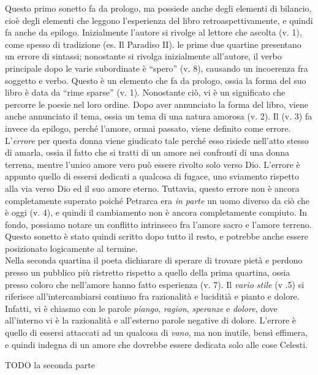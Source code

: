 \documentclass[a4paper]{article}
\newcommand{\quotes}[1]{``#1''}
\begin{document}
Questo primo sonetto fa da prologo, ma possiede anche degli elementi di bilancio,
cioè degli elementi che leggono l'esperienza del libro retroaspettivamente,
e quindi fa anche da epilogo.
Inizialmente l'autore si rivolge al lettore che ascolta (v. 1), come spesso di tradizione (es. Il Paradiso II).
le prime due quartine presentano un errore di sintassi; nonostante si rivolga inizialmente all'autore,
il verbo principale dopo le varie subordinate è \quotes{spero} (v. 8), causando un incoerenza fra soggetto e verbo.
Questo è un elemento che fa da prologo, ossia la forma del suo libro è data da \quotes{rime sparse} (v. 1).
Nonostante ciò, vi è un significato che percorre le poesie nel loro ordine.
Dopo aver annunciato la forma del libro, viene anche annunciato il tema, ossia
un tema di una natura amorosa (v. 2).
Il (v. 3) fa invece da epilogo, perché l'amore, ormai passato, viene definito come errore.
L'\textit{errore} per questa donna viene giudicato tale perché esso risiede nell'atto stesso di amarla,
ossia il fatto che si tratti di un amore nei confronti di una donna terrena, mentre l'unico amore
vero può essere rivolto solo verso Dio. L'errore è appunto quello di essersi dedicati a qualcosa di fugace,
uno sviamento rispetto alla via verso Dio ed il suo amore eterno.
Tuttavia, questo errore non è ancora completamente superato poiché Petrarca
era \textit{in parte} un uomo diverso da ciò che è oggi (v. 4), e quindi il cambiamento non è ancora
completamente compiuto.
In fondo, possiamo notare un conflitto intrinseco fra l'amore sacro e l'amore terreno.
Questo sonetto è stato quindi scritto dopo tutto il resto, e potrebbe anche essere posizionato
logicamente al termine.
\\
Nella seconda quartina il poeta dichiarare di sperare di trovare pietà e perdono
presso un pubblico più ristretto rispetto a quello della prima quartina,
ossia presso coloro che nell'amore hanno fatto esperienza (v. 7).
Il \textit{vario stile} (v .5) si riferisce all'intercambiarsi continuo fra
razionalità e luciditià e pianto e dolore. Infatti, vi è chiasmo con le parole \textit{piango},
\textit{ragion}, \textit{speranze} e \textit{dolore}, dove all'interno vi è la razionalità e all'esterno
parole negative di dolore.
L'errore è quello di essersi attaccati ad un qualcosa di \textit{vano}, ma non inutile, bensì effimera, e quindi
indegna di un amore che dovrebbe essere dedicata solo alle cose Celesti.

TODO la seconda parte

\pagebreak
\end{document}
